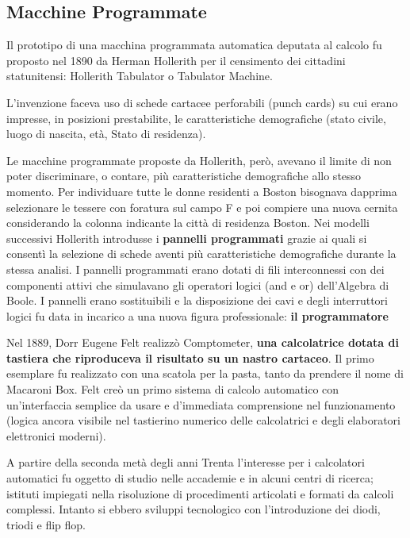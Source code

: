 \documentclass[12pt]{article}
\begin{document}
\subsection{Macchine Programmate}
Il prototipo di una macchina programmata automatica deputata al calcolo fu proposto nel 1890 da Herman Hollerith per il censimento dei cittadini statunitensi: Hollerith Tabulator o Tabulator Machine. 
\par\medskip\noindent
L’invenzione faceva uso di schede cartacee perforabili (punch cards) su cui erano impresse, in posizioni prestabilite, le caratteristiche demografiche (stato civile, luogo di nascita, età, Stato di residenza).\par\medskip\noindent
Le macchine programmate proposte da Hollerith, però, avevano il limite di non poter discriminare, o contare, più caratteristiche demografiche allo stesso momento. Per individuare tutte le donne residenti a Boston bisognava dapprima selezionare le tessere con foratura sul campo F e poi compiere una nuova cernita considerando la colonna indicante la città di residenza Boston. Nei modelli successivi Hollerith introdusse i \textbf{pannelli programmati} grazie ai quali si consentì la selezione di schede aventi più caratteristiche demografiche durante la stessa analisi. I pannelli programmati erano dotati di fili interconnessi con dei componenti attivi che simulavano gli operatori logici (and e or) dell’Algebra di Boole. I pannelli erano sostituibili e la disposizione dei cavi e degli interruttori logici fu data in incarico a una nuova figura professionale: \textbf{il programmatore}\par\medskip\noindent
Nel 1889, Dorr Eugene Felt realizzò Comptometer, \textbf{una calcolatrice dotata di tastiera che riproduceva il risultato su un nastro cartaceo}. Il primo esemplare fu realizzato con una scatola per la pasta, tanto da prendere il nome di Macaroni Box. Felt creò un primo sistema di calcolo automatico con un’interfaccia semplice da usare e d’immediata comprensione nel funzionamento (logica ancora visibile nel tastierino numerico delle calcolatrici e degli elaboratori elettronici moderni). \par\medskip\noindent
A partire della seconda metà degli anni Trenta l’interesse per i calcolatori automatici fu oggetto di studio nelle accademie e in alcuni centri di ricerca; istituti impiegati nella risoluzione di procedimenti articolati e formati da calcoli complessi. Intanto si ebbero sviluppi tecnologico con l’introduzione dei diodi, triodi e flip flop.\par\medskip\noindent
\end{document}
